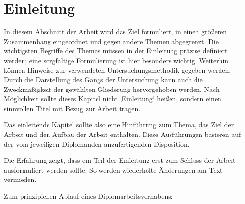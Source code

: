 \section{Einleitung}
In diesem Abschnitt der Arbeit wird das Ziel formuliert, in einen größeren Zusammenhang eingeordnet und gegen andere Themen abgegrenzt. Die wichtigsten Begriffe des Themas müssen in der Einleitung präzise definiert werden; eine sorgfältige Formulierung ist hier besonders wichtig. Weiterhin können Hinweise zur verwendeten Untersuchungsmethodik gegeben werden. Durch die Darstellung des Gangs der Untersuchung kann auch die Zweckmäßigkeit der gewählten Gliederung hervorgehoben werden.  Nach Möglichkeit sollte dieses Kapitel nicht ‚Einleitung‘ heißen, sondern einen sinnvollen Titel mit Bezug zur Arbeit tragen.

Das einleitende Kapitel sollte also eine Hinführung zum Thema, das Ziel der Arbeit und den Aufbau der Arbeit enthalten. Diese Ausführungen basieren auf der vom jeweiligen Diplomanden anzufertigenden Disposition.

Die Erfahrung zeigt, dass ein Teil der Einleitung erst zum Schluss der Arbeit ausformuliert  werden sollte. So werden wiederholte Änderungen am Text vermieden.

Zum prinzipiellen Ablauf eines Diplomarbeitsvorhabens:

